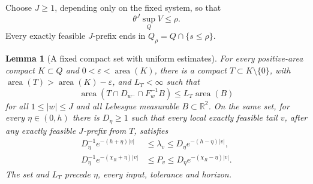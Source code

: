 \documentclass[11pt]{amsart}
\newtheorem{lemma}[theorem]{Lemma}
\theoremstyle{definition}
\theoremstyle{remark}
\newcommand{\R}{\mathbb R}
\newcommand{\area}{\operatorname{area}}
\numberwithin{equation}{section}
\begin{document}
Choose \(J\ge1\), depending only on the fixed system, so that
\begin{equation}\label{eq:localentry}
\theta^J\sup_Q V\le\rho .
\end{equation}
Every exactly feasible \(J\)-prefix ends in
\(Q_\rho=Q\cap\{s\le\rho\}\).

\begin{lemma}[A fixed compact set with uniform estimates]\label{lem:regularwindow}
For every positive-area compact \(K\subset Q\) and
\(0<\varepsilon<\area(K)\), there is a compact
\(T\subset K\setminus\{0\}\), with
\(\area(T)>\area(K)-\varepsilon\), and \(L_T<\infty\) such that
\begin{equation}\label{eq:finitecharts}
\area(T\cap D_{w^-}\cap F_w^{-1}B)\le L_T\area(B)
\end{equation}
for all \(1\le|w|\le J\) and all Lebesgue measurable
\(B\subset\R^2\).
On the same set, for every \(\eta\in(0,h)\) there is \(D_{\eta}\ge1\) such
that every local exactly feasible tail \(v\), after any exactly
feasible \(J\)-prefix from \(T\), satisfies
\begin{equation}\label{eq:typicalproducts}
\begin{split}
D_{\eta}^{-1}e^{-(h+\eta)|v|}&\le\lambda_v\le D_{\eta} e^{-(h-\eta)|v|},\\
D_{\eta}^{-1}e^{-(\chi_R+\eta)|v|}&\le P_v\le D_{\eta} e^{-(\chi_R-\eta)|v|}.
\end{split}
\end{equation}
The set and \(L_T\) precede \(\eta\), every input, tolerance and horizon.
\end{lemma}
\end{document}
